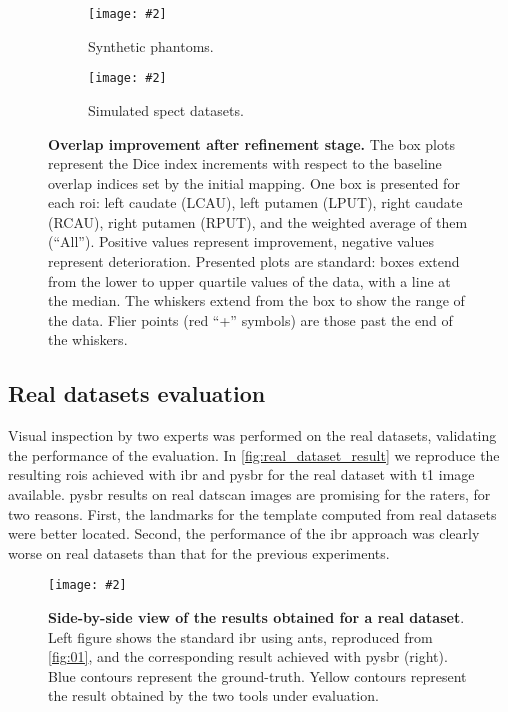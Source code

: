 \documentclass{frontiers}
\newcommand{\insertgraphic}[2]{\texttt{[image: \#2]}}
\newcommand{\insertgraphic}[2]{\texttt{[image: \#2]}}
\begin{document}
\begin{figure*}[ht]
\centering 
\begin{subfigure}[b]{0.61\linewidth}
\insertgraphic{width=1.0\linewidth}{figures/05-results-phantoms}
\caption{\label{fig:results_a}
Synthetic phantoms.
}
\end{subfigure}
\hfill
\begin{subfigure}[b]{0.33\linewidth}
\insertgraphic{width=1.0\linewidth}{figures/05-results-simulated}
\caption{\label{fig:results_b}
Simulated \gls*{spect} datasets.
}
\end{subfigure}

\caption{\label{fig:results}
\textbf{Overlap improvement after refinement stage.}
The box plots represent the Dice index increments with respect to the baseline overlap
  indices set by the initial mapping. One box is presented for each \gls*{roi}:
  left caudate (LCAU), left putamen (LPUT), right caudate (RCAU), right putamen (RPUT),
  and the weighted average of them (``All''). Positive values represent improvement,
  negative values represent deterioration.
Presented plots are standard: boxes extend from the lower to upper quartile values
  of the data, with a line at the median. The whiskers extend from the box to show
  the range of the data. Flier points (red ``+'' symbols) are those past the end of
  the whiskers.
}
\end{figure*}

\subsection{Real datasets evaluation}
\label{sec:results_real}
\cbstart
Visual inspection by two experts was performed on the real datasets,
  validating the performance of the evaluation.
In \autoref{fig:real_dataset_result} we reproduce the resulting \glspl*{roi} achieved
  with \gls*{ibr} and \gls*{pysbr} for the real dataset with \gls*{t1} image
  available.
\Gls*{pysbr} results on real \gls*{datscan} images are promising for the raters,
  for two reasons.
\cbend
First, the landmarks for the template computed from real datasets were 
  better located.
Second, the performance of the \gls*{ibr} approach was clearly worse on
  real datasets than that for the previous experiments.

\begin{figure}
\centering 
\insertgraphic{width=1.0\linewidth}{figures/06-results-mri-pysbr}
\caption{ \label{fig:real_dataset_result} 
  \textbf{Side-by-side view of the results obtained for a real dataset}.
  Left figure shows the standard \gls*{ibr} using \gls*{ants}, reproduced from
  \autoref{fig:01}, and the corresponding result achieved with \gls*{pysbr}
  (right). Blue contours represent the ground-truth. Yellow contours represent
  the result obtained by the two tools under evaluation.
}
\end{figure}
\end{document}
